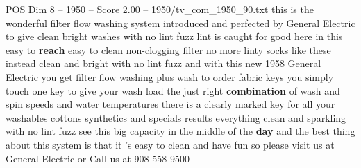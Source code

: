 \begin{textsample}{POS Dim 8 – 1950 – Score 2.00 – 1950/tv\_com\_1950\_90.txt}  \label{ex:f8_pos_019}
this is the wonderful filter flow washing system introduced and perfected by General Electric to give clean bright washes with no lint fuzz lint is caught for good here in this easy to \textbf{reach} easy to clean non-clogging filter no more linty socks like these instead clean and bright with no lint fuzz and with this new 1958 General Electric you get filter flow washing plus wash to order fabric keys you simply touch one key to give your wash load the just right \textbf{combination} of wash and spin speeds and water temperatures there is a clearly marked key for all your washables cottons synthetics and specials results everything clean and sparkling with no lint fuzz see this big capacity in the middle of the \textbf{day} and the best thing about this system is that it 's easy to clean and have fun so please visit us at General Electric or Call us at 908-558-9500

\end{textsample}
